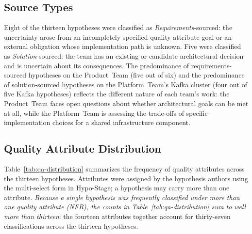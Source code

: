 \subsection{Source Types}
\label{subsec:source-types}

Eight of the thirteen hypotheses were classified as \textit{Requirements}-sourced:
the uncertainty arose from an incompletely specified quality-attribute goal or
an external obligation whose implementation path is unknown. Five were classified
as \textit{Solution}-sourced: the team has an existing or candidate architectural
decision and is uncertain about its consequences. The predominance of
requirements-sourced hypotheses on the Product~Team (five out of six) and
the predominance of solution-sourced hypotheses on the Platform~Team's Kafka
cluster (four out of five Kafka hypotheses) reflects the different nature of
each team's work: the Product~Team faces open questions about whether architectural
goals can be met at all, while the Platform~Team is assessing the trade-offs of
specific implementation choices for a shared infrastructure component.

\subsection{Quality Attribute Distribution}
\label{subsec:qa-distribution}

Table~\ref{tab:qa-distribution} summarizes the frequency of quality attributes
across the thirteen hypotheses. Attributes were assigned by the hypothesis authors
using the multi-select form in Hypo-Stage; a hypothesis may carry more than one
attribute. \emph{Because a single hypothesis was frequently classified under more
than one quality attribute (NFR), the counts in Table~\ref{tab:qa-distribution} sum
to well more than thirteen}: the fourteen attributes together account for thirty-seven
classifications across the thirteen hypotheses.

